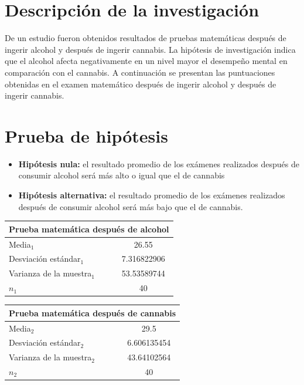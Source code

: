 \documentclass[a4paper]{report}
\begin{document}
    
    
\section{Descripción de la investigación}
De un estudio fueron obtenidos resultados de pruebas matemáticas después de ingerir alcohol y después de ingerir cannabis. La hipótesis de investigación indica que el alcohol afecta negativamente en un nivel mayor el desempeño mental en comparación con el cannabis.
A continuación se presentan las puntuaciones obtenidas en el examen matemático después de ingerir alcohol y después de ingerir cannabis.

\section{Prueba de hipótesis}

\begin{itemize}
    \item \textbf{Hipótesis nula:} el resultado promedio de los exámenes realizados después de consumir alcohol será más alto o igual que el de cannabis
    \item \textbf{Hipótesis alternativa:} el resultado promedio de los exámenes realizados después de consumir alcohol será más bajo que el de cannabis.
\end{itemize}

\begin{center}
    {
        \begin{tabular}{ |l|c| }
            \hline
                \multicolumn{2}{|c|}{\textbf{Prueba matemática después de alcohol}} 
            \\ 
            \hline
                Media$_1$ & 26.55 \\ 
            \hline
                Desviación estándar$_1$ & 7.316822906 \\ 
            \hline
                Varianza de la muestra$_1$ & 53.53589744 \\ 
            \hline
                $n_1$ & 40 \\ 
            \hline
        \end{tabular}
    }
    {
        \begin{tabular}{ |l|c| }
            \hline
                \multicolumn{2}{|c|}{\textbf{Prueba matemática después de cannabis}} 
            \\ 
            \hline
                Media$_2$ & 29.5 \\ 
            \hline
                Desviación estándar$_2$ & 6.606135454 \\ 
            \hline
                Varianza de la muestra$_2$ & 43.64102564 \\ 
            \hline
                $n_2$ & 40 \\ 
            \hline
        \end{tabular}
    }
\end{center}
\end{document}
